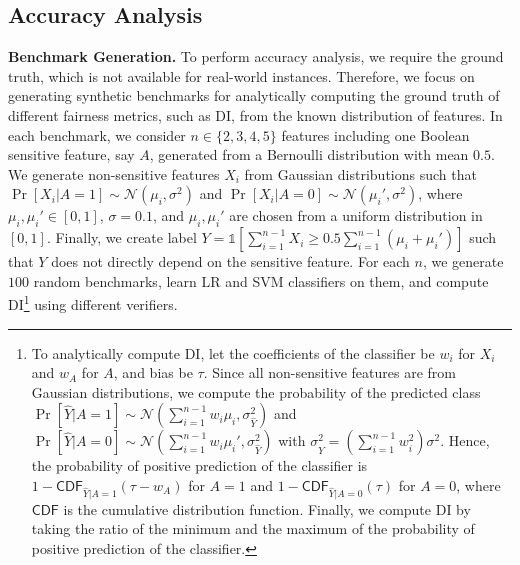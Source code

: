 \subsection{Accuracy Analysis}
\noindent\textbf{Benchmark Generation.} To perform accuracy analysis, we require the ground truth, which is not available for real-world instances. Therefore, we focus on generating synthetic benchmarks for analytically computing the ground truth of different fairness metrics, such as DI, from the known distribution of features. In each benchmark, we consider $ n \in \{2, 3, 4, 5\} $ features including one Boolean sensitive feature, say $ A $, generated from a Bernoulli distribution with mean $ 0.5 $.  We generate non-sensitive features $ X_i $ from Gaussian distributions such that   $ \Pr[X_i | A = 1] \sim \mathcal{N}(\mu_i, \sigma^2) $ and $ \Pr[X_i | A = 0] \sim \mathcal{N}(\mu_i', \sigma^2) $, where $ \mu_i, \mu_i' \in [0,1] $, $ \sigma = 0.1 $, and $ \mu_i, \mu_i' $ are chosen from a uniform distribution in $ [0,1] $. Finally, we create label $ Y = \mathds{1}[ \sum_{i=1}^{n-1} X_i \ge 0.5 \sum_{i=1}^{n-1} (\mu_i + \mu_i')] $ such that $ Y $ does not directly depend on the sensitive feature. For each $ n $, we generate $ 100 $ random benchmarks, learn LR and SVM classifiers on them, and compute DI\footnote{  
To analytically compute DI, let the coefficients of the classifier be $ w_i $ for $ X_i $ and $ w_A $ for $ A $, and bias be $ \tau $. Since all non-sensitive features are from Gaussian distributions, we compute the probability of the predicted class $ \Pr[\hat{Y} | A = 1]  \sim \mathcal{N}(\sum_{i=1}^{n-1}w_i\mu_i, \sigma_{\hat{Y}}^2) $ and $ \Pr[\hat{Y} | A = 0]  \sim \mathcal{N}(\sum_{i=1}^{n-1}w_i\mu_i', \sigma_{\hat{Y}}^2) $ with $ \sigma_{\hat{Y}}^2 =   (\sum_{i=1}^{n-1}w_i^2)\sigma^2 $. Hence, the probability of positive prediction of the classifier  is $  1 - \mathsf{CDF}_{\hat{Y}| A =1}(\tau - w_A) $ for $ A = 1 $ and $  1 - \mathsf{CDF}_{\hat{Y}|A=0}(\tau) $ for $ A = 0 $, where $ \mathsf{CDF} $ is the cumulative distribution function. Finally, we compute DI by taking the ratio of the minimum and the maximum of the probability of positive prediction of the classifier.}
using different verifiers.



